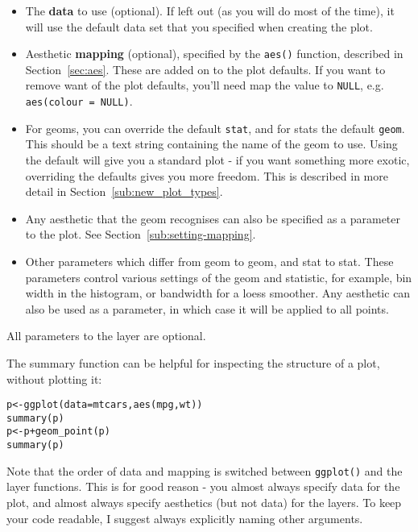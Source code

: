 \begin{itemize}
	\item The {\bf data} to use (optional).  If left out (as you will do most of the time), it will use the default data set that you specified when creating the plot.  

	\item Aesthetic {\bf mapping} (optional), specified by the {\tt aes()} function, described in Section~\ref{sec:aes}.  These are added on to the plot defaults.  If you want to remove want of the plot defaults, you'll need map the value to {\tt NULL}, e.g. {\tt aes(colour = NULL)}.
	
	\item For geoms, you can override the default {\tt stat}, and for stats the default {\tt geom}.  This should be a text string containing the name of the geom to use.  Using the default will give you a standard plot - if you want something more exotic, overriding the defaults gives you more freedom.  This is described in more detail in Section~\ref{sub:new_plot_types}.
	
	\item Any aesthetic that the geom recognises can also be specified as a parameter to the plot.  See Section~\ref{sub:setting-mapping}.

	\item Other parameters which differ from geom to geom, and stat to stat.  These parameters control various settings of the geom and statistic, for example, bin width in the histogram, or bandwidth for a loess smoother.  Any aesthetic can also be used as a parameter, in which case it will be applied to all points.
\end{itemize}

All parameters to the layer are optional.

The summary function can be helpful for inspecting the structure of a plot, without plotting it:



\begin{alltt}
p <- ggplot(data=mtcars, aes(mpg, wt))
summary(p)
p <- p + geom_point(p)
summary(p)
\end{alltt}

Note that the order of data and mapping is switched between {\tt ggplot()} and the layer functions.  This is for good reason - you almost always specify data for the plot, and almost always specify aesthetics (but not data) for the layers.  To keep your code readable, I suggest always explicitly naming other arguments.

